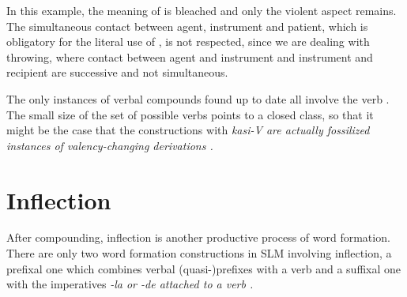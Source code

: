 
In this example, the meaning of  is bleached and only the violent aspect remains. The simultaneous contact between agent, instrument and patient, which is obligatory for the literal use of , is not respected, since we are dealing with throwing, where contact between agent and instrument and instrument and recipient are successive and not simultaneous.

The only instances of verbal compounds found up to date all involve the verb . The small size of the set of possible verbs points to a closed class, so that it might be the  case that the constructions with \em kasi-V \em are actually fossilized instances of valency-changing derivations  \citep[cf. similar uses in other varieties of Malay in ][]{AdelaarEtAl1996, Bakker2006, Paauw2008phd}.




\section{Inflection}\label{sec:wofo:Inflection}
After compounding, inflection is another productive process of word formation.
There are only two word formation constructions in SLM involving inflection, a prefixal one which combines verbal (quasi-)prefixes with a verb  and a suffixal one with the imperatives \em -la \em or \em -de \em attached to a verb .



